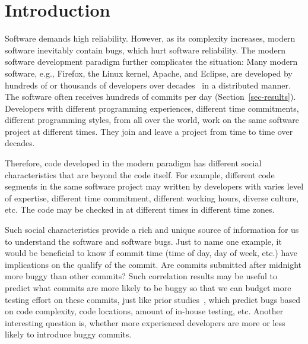 \section{Introduction}

Software demands high reliability. However, as its complexity increases, 
modern software inevitably contain bugs, which hurt software reliability.
The modern software development paradigm further complicates the situation: 
Many modern software, e.g., Firefox, the Linux kernel, Apache, and Eclipse, 
are developed by hundreds of or thousands of developers over decades~\cite{ccomment} 
in a distributed manner. The software often receives hundreds of commits per day (Section~\ref{sec-results}). 
Developers with different programming experiences, 
different time commitments, different programming styles, from all over the world,
work on the same software project at different times. They join and leave a project 
from time to time over decades.

Therefore, code developed in the modern paradigm has different social characteristics 
that are beyond the code itself. For example, different code segments in the same
software project may written by developers with  
varies level of expertise, different time 
commitment, different working hours, diverse culture, etc.
The code may be checked in at different times in different time zones. 

Such social characteristics provide a rich and unique source of information for us to 
understand the software and software bugs. Just to name one example, it would be beneficial to know if  
commit time (time of day, day of week, etc.) have implications on the qualify of the commit. 
Are commits submitted after midnight more buggy than other commits? 
Such correlation results may be useful to predict what commits are more likely
to be buggy so that we can budget more testing effort on these commits, just
like prior studies~\cite{graves00predicting, guo04robust, ostrand05predicting},
which predict bugs based on code complexity, 
code locations, amount of in-house testing, etc. 
Another interesting question is, whether more experienced developers are more or less
likely to introduce buggy commits. 



